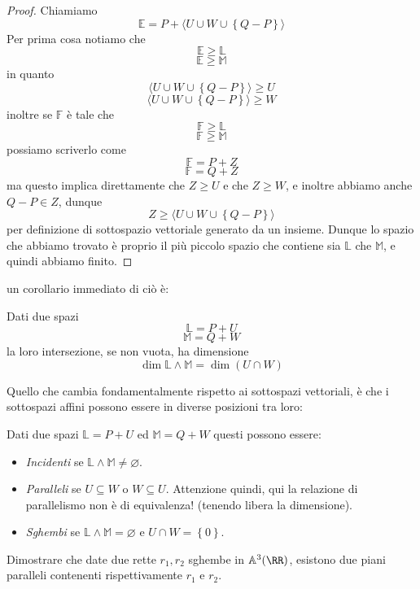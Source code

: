 \documentclass[11pt]{scrartcl}
\newcommand{\eset}{\varnothing}
\renewcommand{\AA}{\mathbb{A}}
\begin{document}
   	 \begin{proof}
   	 	Chiamiamo 
   	 	$$\mathbb{E}=P+\langle U\cup W\cup \left\{Q-P\right\}\rangle$$
   	 	Per prima cosa notiamo che 
   	 	$$\mathbb{E}\ge \mathbb{L}$$
   	 	$$\mathbb{E}\ge \mathbb{M}$$
   	 	in quanto
   	 	$$\langle U\cup W\cup \left\{Q-P\right\}\rangle\ge U$$
   	 	$$\langle U\cup W\cup \left\{Q-P\right\}\rangle\ge W$$
   	 	inoltre se $\mathbb{F}$ è tale che 
   	 	$$\mathbb{F}\ge \mathbb{L}$$
   	 	$$\mathbb{F}\ge \mathbb{M}$$
   	 	possiamo scriverlo come
   	 	$$\mathbb{F}=P+Z$$
   	 	$$\mathbb{F}=Q+Z$$
   	 	ma questo implica direttamente che $Z\ge U$ e che $Z\ge W$, e inoltre abbiamo anche $Q-P\in Z$, dunque 
   	 	$$Z\ge \langle U\cup W\cup \left\{Q-P\right\}\rangle$$
   	 	per definizione di sottospazio vettoriale generato da un insieme. Dunque lo spazio che abbiamo trovato è proprio il più piccolo spazio che contiene sia $\mathbb{L}$ che $\mathbb{M}$, e quindi abbiamo finito.
   	 \end{proof}
   	 un corollario immediato di ciò è:
   	 \begin{corollary}
   	 	Dati due spazi
   	 	$$\mathbb{L}=P+U$$
   	 	$$\mathbb{M}=Q+W$$
   	 	la loro intersezione, se non vuota, ha dimensione
   	 	$$\dim\mathbb{L}\land \mathbb{M}=\dim \left(U\cap W\right)$$
   	 \end{corollary}
   	 Quello che cambia fondamentalmente rispetto ai sottospazi vettoriali, è che i sottospazi affini possono essere in diverse posizioni tra loro:
   	 \begin{definition}
   	 	Dati due spazi $\mathbb{L}=P+U$ ed $\mathbb{M}=Q+W$ questi possono essere:
   	 	\begin{itemize}
   	 		\item \textit{Incidenti} se $\mathbb{L}\land \mathbb{M}\ne \eset$. 
   	 		\item \textit{Paralleli} se $U\subseteq W$ o $W\subseteq U$. Attenzione quindi, qui la relazione di parallelismo non è di equivalenza! (tenendo libera la dimensione).
   	 		\item \textit{Sghembi} se $\mathbb{L}\land \mathbb{M}=\eset$ e $U\cap W=\left\{0\right\}$.
   	 	\end{itemize}
   	 \end{definition}
   	 \begin{example}
   	 	Dimostrare che date due rette $r_1,r_2$ sghembe in $\AA^3(\RR)$, esistono due piani paralleli contenenti rispettivamente $r_1$ e $r_2$.
   	 \end{example}
\end{document}
